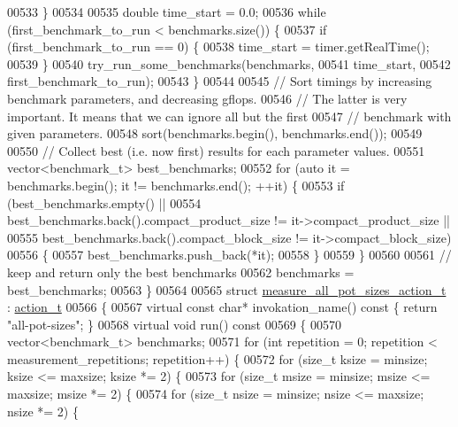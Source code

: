 \begin{DoxyCode}
{{{{{{{00533   \}
00534   
00535   \textcolor{keywordtype}{double} time\_start = 0.0;
00536   \textcolor{keywordflow}{while} (first\_benchmark\_to\_run < benchmarks.size()) \{
00537     \textcolor{keywordflow}{if} (first\_benchmark\_to\_run == 0) \{
00538       time\_start = timer.getRealTime();
00539     \}
00540     try\_run\_some\_benchmarks(benchmarks,
00541                             time\_start,
00542                             first\_benchmark\_to\_run);
00543   \}
00544 
00545   \textcolor{comment}{// Sort timings by increasing benchmark parameters, and decreasing gflops.}
00546   \textcolor{comment}{// The latter is very important. It means that we can ignore all but the first}
00547   \textcolor{comment}{// benchmark with given parameters.}
00548   sort(benchmarks.begin(), benchmarks.end());
00549 
00550   \textcolor{comment}{// Collect best (i.e. now first) results for each parameter values.}
00551   vector<benchmark\_t> best\_benchmarks;
00552   \textcolor{keywordflow}{for} (\textcolor{keyword}{auto} it = benchmarks.begin(); it != benchmarks.end(); ++it) \{
00553     \textcolor{keywordflow}{if} (best\_benchmarks.empty() ||
00554         best\_benchmarks.back().compact\_product\_size != it->compact\_product\_size ||
00555         best\_benchmarks.back().compact\_block\_size != it->compact\_block\_size)
00556     \{
00557       best\_benchmarks.push\_back(*it);
00558     \}
00559   \}
00560 
00561   \textcolor{comment}{// keep and return only the best benchmarks}
00562   benchmarks = best\_benchmarks;
00563 \}
00564 
00565 \textcolor{keyword}{struct }\hyperlink{structmeasure__all__pot__sizes__action__t}{measure\_all\_pot\_sizes\_action\_t} : \hyperlink{structaction__t}{action\_t}
00566 \{
00567   \textcolor{keyword}{virtual} \textcolor{keyword}{const} \textcolor{keywordtype}{char}* invokation\_name()\textcolor{keyword}{ const }\{ \textcolor{keywordflow}{return} \textcolor{stringliteral}{"all-pot-sizes"}; \}
00568   \textcolor{keyword}{virtual} \textcolor{keywordtype}{void} run()\textcolor{keyword}{ const}
00569 \textcolor{keyword}{  }\{
00570     vector<benchmark\_t> benchmarks;
00571     \textcolor{keywordflow}{for} (\textcolor{keywordtype}{int} repetition = 0; repetition < measurement\_repetitions; repetition++) \{
00572       \textcolor{keywordflow}{for} (\textcolor{keywordtype}{size\_t} ksize = minsize; ksize <= maxsize; ksize *= 2) \{
00573         \textcolor{keywordflow}{for} (\textcolor{keywordtype}{size\_t} msize = minsize; msize <= maxsize; msize *= 2) \{
00574           \textcolor{keywordflow}{for} (\textcolor{keywordtype}{size\_t} nsize = minsize; nsize <= maxsize; nsize *= 2) \{
}}}}}}}
\end{DoxyCode}
